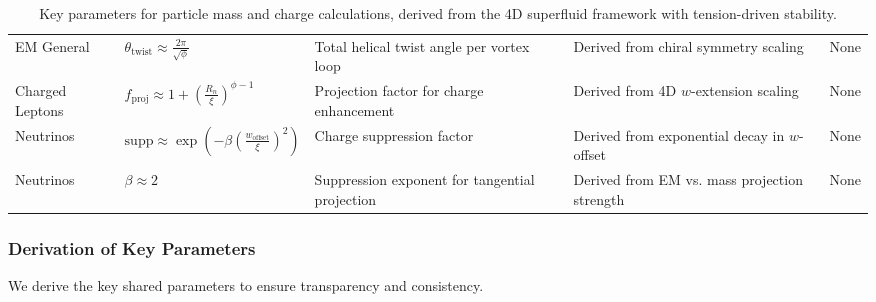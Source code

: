 \begin{sidewaystable}[p]
\begin{tabularx}{\linewidth}{|p{2cm}|p{3cm}|X|X|p{3cm}|}
EM General & $\theta_{\text{twist}} \approx \frac{2\pi}{\sqrt{\phi}}$ & Total helical twist angle per vortex loop & Derived from chiral symmetry scaling & None \\
Charged Leptons & $f_{\text{proj}} \approx 1 + \left(\frac{R_n}{\xi}\right)^{\phi - 1}$ & Projection factor for charge enhancement & Derived from 4D $w$-extension scaling & None \\
Neutrinos & $\text{supp} \approx \exp\left( - \beta \left(\frac{w_{\text{offset}}}{\xi}\right)^2 \right)$ & Charge suppression factor & Derived from exponential decay in $w$-offset & None \\
Neutrinos & $\beta \approx 2$ & Suppression exponent for tangential projection & Derived from EM vs. mass projection strength & None \\
\hline
\end{tabularx}
\caption{Key parameters for particle mass and charge calculations, derived from the 4D superfluid framework with tension-driven stability.}
\label{tab:variables}
\end{sidewaystable}

\subsubsection{Derivation of Key Parameters}
We derive the key shared parameters to ensure transparency and consistency.


